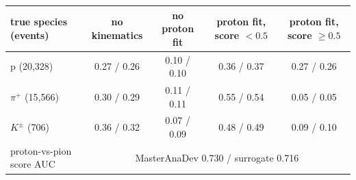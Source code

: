 \begin{tabular}{lcccc}
\toprule
true species (events) & no kinematics & no proton fit & proton fit, score $<0.5$ & proton fit, score $\geq 0.5$ \\
\midrule
p (20,328) & 0.27 / 0.26 & 0.10 / 0.10 & 0.36 / 0.37 & 0.27 / 0.26 \\
$\pi^+$ (15,566) & 0.30 / 0.29 & 0.11 / 0.11 & 0.55 / 0.54 & 0.05 / 0.05 \\
$K^\pm$ (706) & 0.36 / 0.32 & 0.07 / 0.09 & 0.48 / 0.49 & 0.09 / 0.10 \\
\midrule
proton-vs-pion score AUC & \multicolumn{4}{c}{MasterAnaDev 0.730 / surrogate 0.716} \\
\bottomrule
\end{tabular}
